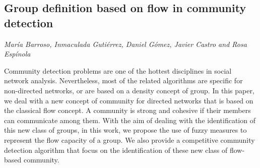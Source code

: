\documentclass[../booklet.tex]{subfiles}
\begin{document}
\subsection[Group definition based on flow in community detection. {\it María Barroso, Inmaculada Gutiérrez, Daniel Gómez, Javier Castro and Rosa Espínola}]{Group definition based on flow in community detection}
    

\begin{center}
  {\it María Barroso, Inmaculada Gutiérrez, Daniel Gómez, Javier Castro and Rosa Espínola}
\end{center}




Community detection problems are one of the hottest disciplines in social network analysis. Nevertheless, most of the related algorithms are specific for non-directed networks, or are based on a density concept of group. In this paper, we deal with a new concept of community for directed networks that is based on the classical flow concept.  A community is strong and cohesive if their members can communicate among them. With the aim of dealing with the identification of this new class of groups, in this work, we propose the use of fuzzy measures to represent the flow capacity of a group. We also provide a competitive community detection algorithm that focus on the identification of these new class of flow-based community. 
\color{black}

\end{document}

